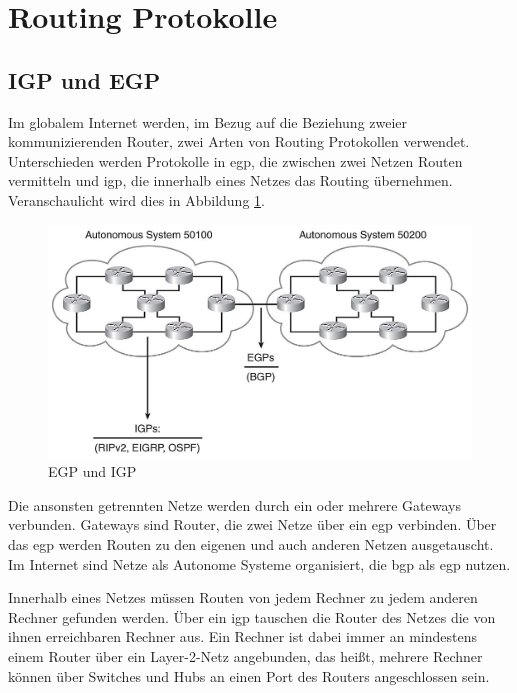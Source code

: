 \documentclass[11pt,a4paper,final]{article}
\begin{document}
\section{Routing Protokolle}
\subsection{IGP und EGP}
Im globalem Internet werden, im Bezug auf die Beziehung zweier kommunizierenden Router, zwei Arten von Routing Protokollen verwendet.
Unterschieden werden Protokolle in \ac{egp}, die zwischen zwei Netzen Routen vermitteln und \ac{igp}, die innerhalb eines Netzes das Routing übernehmen.
Veranschaulicht wird dies in Abbildung \ref{igp_egp}.

\begin{figure}[h]
\includegraphics[width=1.0\textwidth]{images/igp_egp.jpg}
\caption[igp egp]{EGP und IGP\footnotemark}
\label{igp_egp}
\end{figure}

Die ansonsten getrennten Netze werden durch ein oder mehrere Gateways verbunden. Gateways sind Router, die zwei Netze über ein \ac{egp} verbinden. Über das \ac{egp} werden Routen zu den eigenen und auch anderen Netzen ausgetauscht. Im Internet sind Netze als Autonome Systeme organisiert, die \ac{bgp} als \ac{egp} nutzen.
\citep{mcquerry2008}

Innerhalb eines Netzes müssen Routen von jedem Rechner zu jedem anderen Rechner gefunden werden. Über ein \ac{igp} tauschen die Router des Netzes die von ihnen erreichbaren Rechner aus.
Ein Rechner ist dabei immer an mindestens einem Router über ein Layer-2-Netz angebunden, das heißt, mehrere Rechner können über Switches und Hubs an einen Port des Routers angeschlossen sein.
\citep{AndrewS.Tanenbaum2010}
\end{document}

